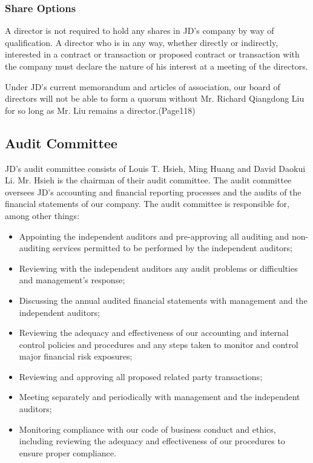 \subsubsection{Share Options}
A director is not required to hold any shares in JD’s company by way of qualification. A director who is in any way, whether directly or indirectly, interested in a contract or transaction or proposed contract or transaction with the company must declare the nature of his interest at a meeting of the directors.

Under JD’s current memorandum and articles of association, our board of directors will not be able to form a quorum without Mr. Richard Qiangdong Liu for so long as Mr. Liu remains a director.(Page118)

\subsection{Audit Committee}
JD’s audit committee consists of Louis T. Hsieh, Ming Huang and David Daokui Li. Mr. Hsieh is the chairman of their audit committee.
The audit committee oversees JD’s accounting and financial reporting processes and the audits of the financial statements of our company.
The audit committee is responsible for, among other things:
\begin{itemize}
\item Appointing the independent auditors and pre-approving all auditing and non-auditing services permitted to be performed by the independent auditors;
\item Reviewing with the independent auditors any audit problems or difficulties and management’s response;
\item Discussing the annual audited financial statements with management and the independent auditors;
\item Reviewing the adequacy and effectiveness of our accounting and internal control policies and procedures and any steps taken to monitor and control major financial risk exposures;
\item Reviewing and approving all proposed related party transactions;
\item Meeting separately and periodically with management and the independent auditors;
\item Monitoring compliance with our code of business conduct and ethics, including reviewing the adequacy and effectiveness of our procedures to ensure proper compliance.
\end{itemize}

